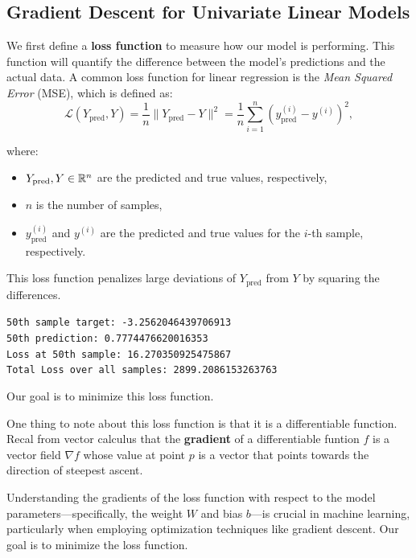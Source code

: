\subsection{Gradient Descent for Univariate Linear Models}
\label{subsec:2}
We first define a \textbf{loss function} to measure how our model is performing. This function will quantify the difference between the model's predictions and the actual data. A common loss function for linear regression is the \textit{Mean Squared Error} (MSE), which is defined as:
\begin{equation}
\label{eq:mse}
\mathcal{L}(Y_{\text{pred}},Y) = \frac{1}{n}\|Y_\text{pred} - Y\|^2 = \frac{1}{n}\sum_{i=1}^n (y_{\text{pred}}^{(i)}-y^{(i)})^2,
\end{equation}

where:
\begin{itemize}
    \item $Y_{\text{pred}},Y \in \mathbb{R}^n$ are the predicted and true values, respectively, 
    \item $n$ is the number of samples,
    \item $y_{\text{pred}}^{(i)}$ and $y^{(i)}$ are the predicted and true values for the $i$-th sample, respectively.
\end{itemize}

This loss function penalizes large deviations of $Y_\text{pred}$ from $Y$ by squaring the differences.


\texttt{50th sample target: -3.2562046439706913\\
50th prediction: 0.7774476620016353\\
Loss at 50th sample: 16.270350925475867\\
Total Loss over all samples: 2899.2086153263763
} 
\linebreak

Our goal is to minimize this loss function. 

One thing to note about this loss function is that it is a differentiable function. Recal from vector calculus that the \textbf{gradient} of a differentiable funtion $f$ is a vector field $\nabla f$ whose value at point $p$ is a vector that points towards the direction of steepest ascent. 

Understanding the gradients of the loss function with respect to the model parameters—specifically, the weight $W$ and bias $b$—is crucial in machine learning, particularly when employing optimization techniques like gradient descent. Our goal is to minimize the loss function. 

